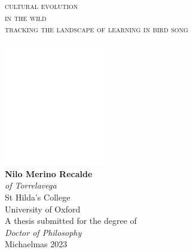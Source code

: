 
\thispagestyle{empty}
\pagecolor{chapterback}
\begin{center}
    \color{white}
    \vspace*{1cm} %
    \begin{center}
        {\fontsize{40pt}{36pt}\selectfont\textsc{cultural evolution\\in the wild}\\[.5cm]\fontsize{17pt}{20pt}\selectfont\textsc{tracking the landscape of learning in bird song}\\}
    \end{center}
    \vspace{8cm} 
    \includegraphics[width=4.5cm]{figures/logos/oxlogo-round.png}\\
    \vspace{1cm} 
    \textbf{Nilo Merino Recalde}\\
    \textit{of Torrelavega}\\
    St Hilda's College\\
    University of Oxford\\

    \vskip 10pt
    A thesis submitted for the degree of\\
    \textit{Doctor of Philosophy}\\
    Michaelmas 2023

\end{center}
\restoregeometry

